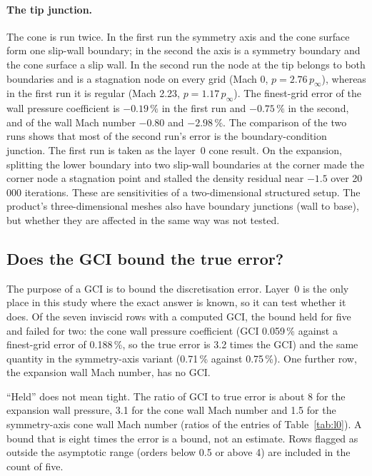\documentclass[11pt,a4paper]{article}
\newcommand{\pinf}{p_\infty}
\begin{document}
\paragraph{The tip junction.}
The cone is run twice.
In the first run the symmetry axis and the cone surface form one slip-wall boundary; in the second the axis is a
symmetry boundary and the cone surface a slip wall.
In the second run the node at the tip belongs to both boundaries and is a stagnation node on every grid (Mach 0,
$p=2.76\,\pinf$), whereas in the first run it is regular (Mach 2.23, $p=1.17\,\pinf$).
The finest-grid error of the wall pressure coefficient is $-0.19\,\%$ in the first run and $-0.75\,\%$ in the
second, and of the wall Mach number $-0.80$ and $-2.98\,\%$.
The comparison of the two runs shows that most of the second run's error is the boundary-condition junction.
The first run is taken as the layer~0 cone result.
On the expansion, splitting the lower boundary into two slip-wall boundaries at the corner made the corner node a
stagnation point and stalled the density residual near $-1.5$ over 20\,000 iterations.
These are sensitivities of a two-dimensional structured setup.
The product's three-dimensional meshes also have boundary junctions (wall to base), but whether they are affected
in the same way was not tested.

\subsection{Does the GCI bound the true error?}
\label{sec:gcibound}

The purpose of a GCI is to bound the discretisation error.
Layer~0 is the only place in this study where the exact answer is known, so it can test whether it does.
Of the seven inviscid rows with a computed GCI, the bound held for five and failed for two:
the cone wall pressure coefficient (GCI 0.059\,\% against a finest-grid error of 0.188\,\%, so the true error is
3.2 times the GCI) and the same quantity in the symmetry-axis variant (0.71\,\% against 0.75\,\%).
One further row, the expansion wall Mach number, has no GCI.

``Held'' does not mean tight.
The ratio of GCI to true error is about 8 for the expansion wall pressure, 3.1 for the cone wall Mach number and
1.5 for the symmetry-axis cone wall Mach number (ratios of the entries of Table~\ref{tab:l0}).
A bound that is eight times the error is a bound, not an estimate.
Rows flagged as outside the asymptotic range (orders below 0.5 or above 4) are included in the count of five.
\end{document}
